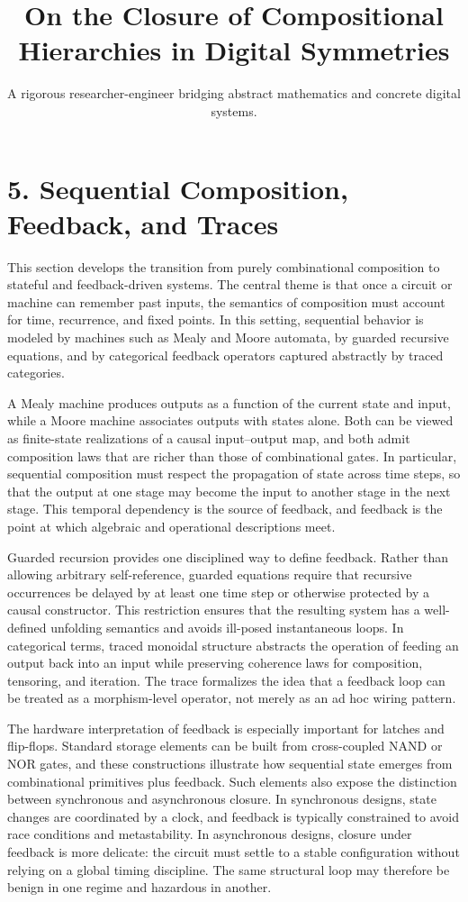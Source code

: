 \documentclass[11pt]{article}
\title{On the Closure of Compositional Hierarchies in Digital Symmetries}
\author{A rigorous researcher-engineer bridging abstract mathematics and concrete digital systems.}
\begin{document}
\section*{5. Sequential Composition, Feedback, and Traces}

This section develops the transition from purely combinational composition to stateful and feedback-driven systems. The central theme is that once a circuit or machine can remember past inputs, the semantics of composition must account for time, recurrence, and fixed points. In this setting, sequential behavior is modeled by machines such as Mealy and Moore automata, by guarded recursive equations, and by categorical feedback operators captured abstractly by traced categories.

A Mealy machine produces outputs as a function of the current state and input, while a Moore machine associates outputs with states alone. Both can be viewed as finite-state realizations of a causal input--output map, and both admit composition laws that are richer than those of combinational gates. In particular, sequential composition must respect the propagation of state across time steps, so that the output at one stage may become the input to another stage in the next stage. This temporal dependency is the source of feedback, and feedback is the point at which algebraic and operational descriptions meet.

Guarded recursion provides one disciplined way to define feedback. Rather than allowing arbitrary self-reference, guarded equations require that recursive occurrences be delayed by at least one time step or otherwise protected by a causal constructor. This restriction ensures that the resulting system has a well-defined unfolding semantics and avoids ill-posed instantaneous loops. In categorical terms, traced monoidal structure abstracts the operation of feeding an output back into an input while preserving coherence laws for composition, tensoring, and iteration. The trace formalizes the idea that a feedback loop can be treated as a morphism-level operator, not merely as an ad hoc wiring pattern.

The hardware interpretation of feedback is especially important for latches and flip-flops. Standard storage elements can be built from cross-coupled NAND or NOR gates, and these constructions illustrate how sequential state emerges from combinational primitives plus feedback. Such elements also expose the distinction between synchronous and asynchronous closure. In synchronous designs, state changes are coordinated by a clock, and feedback is typically constrained to avoid race conditions and metastability. In asynchronous designs, closure under feedback is more delicate: the circuit must settle to a stable configuration without relying on a global timing discipline. The same structural loop may therefore be benign in one regime and hazardous in another.
\end{document}
